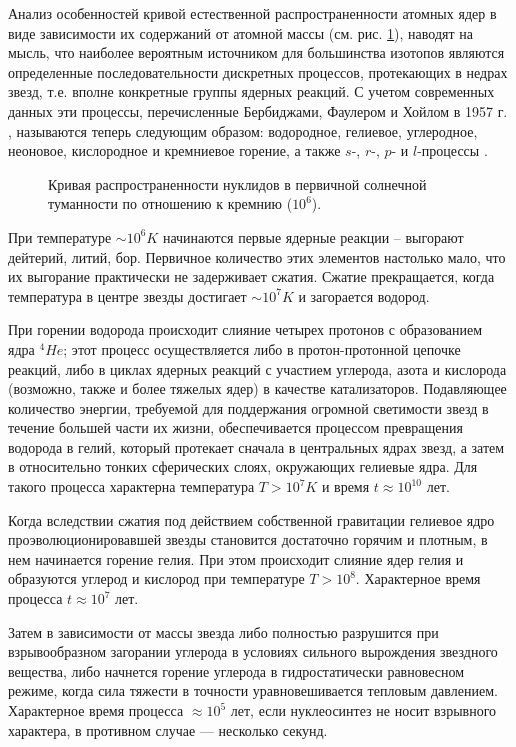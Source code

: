 Анализ особенностей кривой естественной распространенности атомных ядер в виде зависимости их содержаний от атомной массы
(см. рис. \ref{RASPR}), наводят на мысль, что наиболее вероятным источником  для большинства изотопов являются
определенные последовательности дискретных процессов, протекающих в недрах звезд, т.е. вполне конкретные группы ядерных
реакций. С учетом современных данных эти процессы, перечисленные Бербиджами, Фаулером и Хойлом в 1957 г. \cite{burbidge},
называются теперь следующим образом: водородное, гелиевое, углеродное, неоновое, кислородное и кремниевое горение, а
также $s$-, $r$-, $p$- и $l$-процессы \cite{leng, kosmos, iader, 97}.

\begin{figure}
\vspace{18 true cm}
\caption{{Кривая распространенности нуклидов в первичной
солнечной туманности по отношению к кремнию ($10^6$).}}
\label{RASPR}
\end{figure}


При температуре $\sim 10^6 K$ начинаются первые ядерные реакции -- выгорают
дейтерий, литий, бор. Первичное количество этих элементов настолько мало, что их
выгорание практически не задерживает сжатия. Сжатие прекращается, когда температура в центре
звезды достигает $\sim 10^7 K$ и загорается водород.

При горении водорода происходит слияние четырех протонов с образованием ядра
$ ^4 He$; этот процесс осуществляется либо  в про\-тон-про\-тон\-ной цепочке реакций,
либо в циклах ядерных реакций с участием углерода, азота и кислорода (возможно,
также и более тяжелых ядер) в качестве катализаторов. Подавляющее  количество
энергии, требуемой для поддержания огромной светимости звезд в течение большей
части их жизни, обеспечивается процессом превращения водорода в гелий, который
протекает сначала в центральных ядрах звезд, а затем в относительно тонких
сферических слоях, окружающих гелиевые ядра. Для такого процесса характерна
температура $T>10^7 K$ и время $t\approx 10^{10}$ лет.

Когда вследствии сжатия под действием собственной гравитации гелиевое ядро
проэволюционировавшей звезды становится достаточно горячим и плотным,
в нем начинается горение гелия. При этом происходит слияние ядер гелия и
образуются углерод и кислород при температуре $T>10^8$. Характерное время процесса
$t \approx 10^7 $ лет.

Затем в зависимости от массы звезда либо полностью разрушится
при взрывообразном загорании углерода в условиях сильного вырождения звездного
вещества, либо начнется горение углерода в гидростатически равновесном режиме,
когда сила тяжести в точности уравновешивается тепловым давлением.
Характерное время процесса $\approx 10^5$ лет, если нуклеосинтез
не носит взрывного характера, в противном случае ---
несколько секунд.


